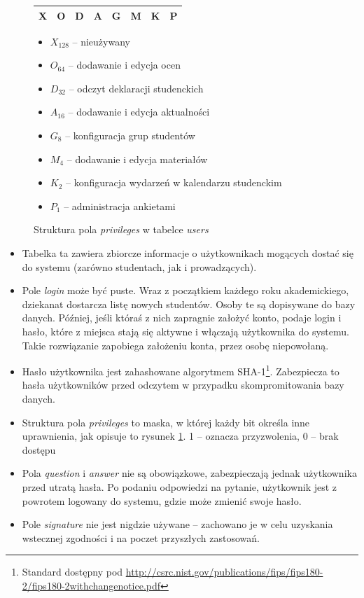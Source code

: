\documentclass[a4paper,12pt,oneside]{report}
\begin{document}
\begin{figure}[h]
  \centering
  \begin{tabular}{|c|c|c|c|c|c|c|c|}\hline
    X & O & D & A & G & M & K & P \\\hline
  \end{tabular}
  \begin{itemize}
    \item $X_{128}$ -- nieużywany
    \item $O_{64}$ -- dodawanie i edycja ocen
    \item $D_{32}$ -- odczyt deklaracji studenckich
    \item $A_{16}$ -- dodawanie i edycja aktualności
    \item $G_8$ -- konfiguracja grup studentów
    \item $M_4$ -- dodawanie i edycja materiałów
    \item $K_2$ -- konfiguracja wydarzeń w kalendarzu studenckim
    \item $P_1$ -- administracja ankietami
  \end{itemize}
  \caption{Struktura pola \emph{privileges} w tabelce \emph{users}\label{fig:privileges}}
\end{figure}

\begin{itemize}
  \item Tabelka ta zawiera zbiorcze informacje o użytkownikach mogących dostać się do systemu (zarówno studentach, jak i prowadzących).
  \item Pole \emph{login} może być puste. Wraz z początkiem każdego roku akademickiego, dziekanat dostarcza listę nowych studentów. Osoby te są dopisywane do bazy danych. Później, jeśli któraś z nich zapragnie założyć konto, podaje login i hasło, które z miejsca stają się aktywne i włączają użytkownika do systemu. Takie rozwiązanie zapobiega założeniu konta, przez osobę niepowołaną.
  \item Hasło użytkownika jest zahashowane algorytmem SHA-1\footnote{Standard dostępny pod \url{http://csrc.nist.gov/publications/fips/fips180-2/fips180-2withchangenotice.pdf}}. Zabezpiecza to hasła użytkowników przed odczytem w przypadku skompromitowania bazy danych.
  \item Struktura pola \emph{privileges} to maska, w której każdy bit określa inne uprawnienia, jak opisuje to rysunek \ref{fig:privileges}. 1 -- oznacza przyzwolenia, 0 -- brak dostępu
  \item Pola \emph{question} i \emph{answer} nie są obowiązkowe, zabezpieczają jednak użytkownika przed utratą hasła. Po podaniu odpowiedzi na pytanie, użytkownik jest z powrotem logowany do systemu, gdzie może zmienić swoje hasło.
  \item Pole \emph{signature} nie jest nigdzie używane -- zachowano je w celu uzyskania wstecznej zgodności i na poczet przyszłych zastosowań.
\end{itemize}
\end{document}
